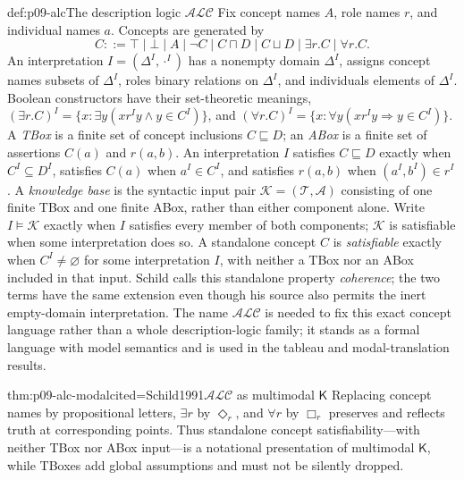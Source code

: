 \begin{hbdefinition}{def:p09-alc}{The description logic \(\mathcal{ALC}\)}
Fix concept names \(A\), role names \(r\), and individual names \(a\).
Concepts are generated by
\[
 C ::= \top\mid\bot\mid A\mid\neg C\mid C\sqcap D\mid C\sqcup D
       \mid \exists r.C\mid\forall r.C.
\]
An interpretation \(I=(\Delta^I,\cdot^I)\) has a nonempty domain
\(\Delta^I\), assigns concept names subsets of \(\Delta^I\), roles binary
relations on \(\Delta^I\), and individuals elements of \(\Delta^I\). Boolean
constructors have their set-theoretic meanings,
\((\exists r.C)^I=\{x:\exists y(xr^Iy\land y\in C^I)\}\), and
\((\forall r.C)^I=\{x:\forall y(xr^Iy\Rightarrow y\in C^I)\}\).
A \emph{TBox} is a finite set of concept inclusions \(C\sqsubseteq D\); an
\emph{ABox} is a finite set of assertions \(C(a)\) and \(r(a,b)\).
An interpretation \(I\) satisfies \(C\sqsubseteq D\) exactly when
\(C^I\subseteq D^I\), satisfies \(C(a)\) when \(a^I\in C^I\), and satisfies
\(r(a,b)\) when \((a^I,b^I)\in r^I\).  A \emph{knowledge base} is the
syntactic input pair \(\mathcal K=(\mathcal T,\mathcal A)\) consisting of one
finite TBox and one finite ABox, rather than either component alone.  Write
\(I\models\mathcal K\) exactly when \(I\) satisfies every member of both
components; \(\mathcal K\) is satisfiable when some interpretation does so.
A standalone concept \(C\) is \emph{satisfiable} exactly when
\(C^I\ne\varnothing\) for some interpretation \(I\), with neither a TBox nor
an ABox included in that input.  Schild calls this standalone property
\emph{coherence}; the two terms have the same extension even though his source
also permits the inert empty-domain interpretation.
The name
\(\mathcal{ALC}\) is needed to fix this exact concept language rather than a
whole description-logic family; it stands as a formal language with model
semantics and is used in the tableau and modal-translation results.
\end{hbdefinition}

\begin{hbtheorem}{thm:p09-alc-modal}{cited=Schild1991}{\(\mathcal{ALC}\) as multimodal \(\mathsf K\)}
Replacing concept names by propositional letters, \(\exists r\) by
\(\Diamond_r\), and \(\forall r\) by \(\Box_r\) preserves and reflects truth
at corresponding points. Thus standalone concept satisfiability---with neither
TBox nor ABox input---is a notational presentation of multimodal \(\mathsf K\),
while TBoxes add global assumptions and must not be silently dropped.
\end{hbtheorem}


